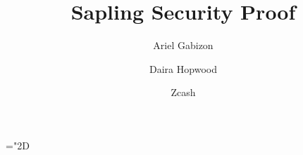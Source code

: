 \documentclass[11pt]{article}
\title{%
Sapling Security Proof}
\author{Ariel Gabizon \and Daira Hopwood}
\date{Zcash}
\numberwithin{equation}{section} %
\numberwithin{figure}{section} %
\newcommand{\set}[1]{\ensuremath{\left\{#1\right\}}\xspace}
\begin{document}
\maketitle
 \mathchardef\mhyphen="2D

\newcommand{\grouppair}{\ensuremath{G^*}\xspace}

\newcommand{\Gt}{\ensuremath{{\mathbb G}_t}\xspace}
\newcommand{\F}{\ensuremath{{\mathbb F}_r}\xspace}
\newcommand{\help}[1]{$#1$-helper\xspace}
\newcommand{\randompair}[1]{\ensuremath{\mathsf{randomPair}(#1)}\xspace}
\newcommand{\pair}[1]{$#1$-pair\xspace}
\newcommand{\pairs}[1]{$#1$-pairs\xspace}
\newcommand{\pubvalsOf}[1]{\ensuremath{\mathrm{pub}(#1)}\xspace}
\newcommand{\pairone}[1]{\G1-$#1$-pair\xspace}
\newcommand{\pairtwo}[1]{\G2-$#1$-pair\xspace}
\newcommand{\sameratio}[2]{\ensuremath{\mathsf{SameRatio}(#1,#2)}\xspace}
\newcommand{\vecc}[2]{\ensuremath{(#1)_{#2}}\xspace}
\newcommand{\players}{\ensuremath{[n]}\xspace}
\newcommand{\ci}{\ensuremath{\mathrm{CI}}\xspace}
\newcommand{\pairvec}[1]{$#1$-vector\xspace}
\newcommand{\Fq}{\ensuremath{\mathbb{F}_q}\xspace}
\newcommand{\sigscheme}{\ensuremath{\mathscr S}\xspace}

\newcommand{\randpair}[1]{\ensuremath{\mathsf{rp}_{#1}}\xspace}
\newcommand{\randpairone}[1]{\ensuremath{\mathsf{rp}_{#1}^{1}}\xspace}

\newcommand{\randpairtwo}[1]{\ensuremath{\mathsf{rp_{#1}^2}}\xspace}%

\newcommand{\pos}{\ensuremath{\mathsf{pos}}\xspace}
\newcommand{\rej}{\ensuremath{\mathsf{rej}}\xspace}
\newcommand{\acc}{\ensuremath{\mathsf{acc}}\xspace}
\newcommand{\sha}[1]{\ensuremath{\mathsf{COMMIT}(#1)}\xspace}
 \newcommand{\shaa}{\ensuremath{\mathsf{COMMIT}}\xspace}
 \newcommand{\comm}[1]{\ensuremath{\mathsf{comm}_{#1}}\xspace}
 \newcommand{\defeq}{:=}

\newcommand{\A}{\ensuremath{\vec{A}}\xspace}
\newcommand{\B}{\ensuremath{\vec{B}}\xspace}
\newcommand{\C}{\ensuremath{\vec{C}}\xspace}
\newcommand{\Btwo}{\ensuremath{\vec{B_2}}\xspace}
\newcommand{\treevecsimp}{\ensuremath{(\tau,\rho_A,\rho_A \rho_B,\rho_A\alpha_A,\rho_A\rho_B\alpha_B, \rho_A\rho_B\alpha_C,\beta,\beta\gamma)}\xspace}%
\newcommand{\rcptc}{random-coefficient subprotocol\xspace}
\newcommand{\rcptcparams}[2]{\ensuremath{\mathrm{RCPC}(#1,#2)}\xspace}
\newcommand{\verifyrcptcparams}[2]{\ensuremath{\mathrm{\mathsf{verify}RCPC}(#1,#2)}\xspace}
\end{document}
